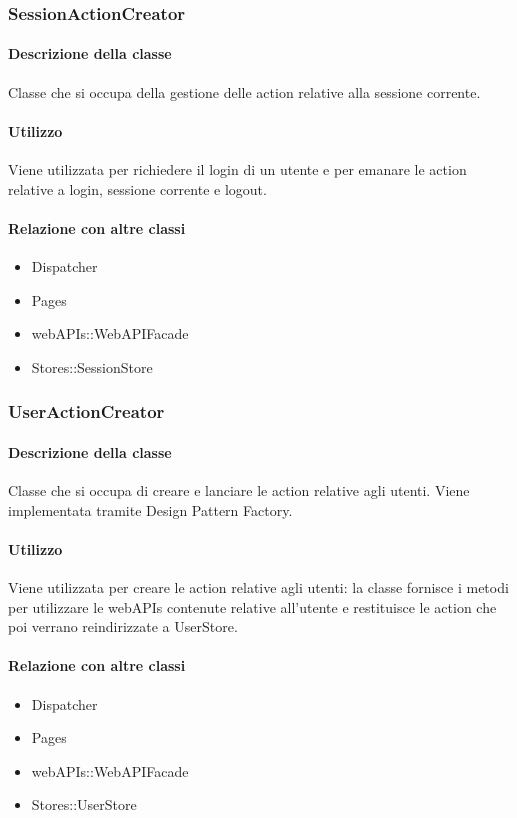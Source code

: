 \subsubsection{SessionActionCreator}
\paragraph*{Descrizione della classe}
Classe che si occupa della gestione delle action relative alla sessione corrente.

\paragraph*{Utilizzo}
Viene utilizzata per richiedere il login di un utente e per emanare le action relative a login, sessione corrente e logout.

\paragraph*{Relazione con altre classi}
\begin{itemize}
\item Dispatcher
\item Pages
\item webAPIs::WebAPIFacade
\item Stores::SessionStore
\end{itemize}

\subsubsection{UserActionCreator}
\paragraph*{Descrizione della classe}
Classe che si occupa di creare e lanciare le action relative agli utenti. Viene implementata tramite Design Pattern Factory.
\paragraph*{Utilizzo}
Viene utilizzata per creare le action relative agli utenti: la classe fornisce i metodi per utilizzare le webAPIs contenute relative all'utente e restituisce le action che poi verrano reindirizzate a UserStore.

\paragraph*{Relazione con altre classi}
\begin{itemize}
\item Dispatcher
\item Pages
\item webAPIs::WebAPIFacade
\item Stores::UserStore
\end{itemize}

